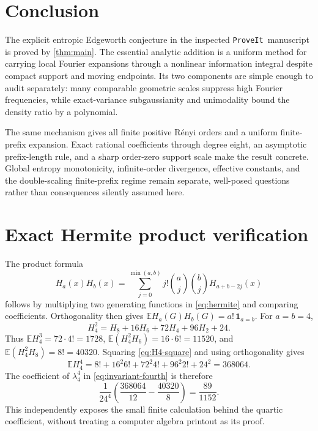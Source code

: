 \documentclass[11pt,a4paper]{article}
\numberwithin{equation}{section}
\theoremstyle{definition}
\theoremstyle{remark}
\newcommand{\E}{\mathbb E}
\newcommand{\repo}{\texttt{ProveIt}}
\begin{document}
\section{Conclusion}

The explicit entropic Edgeworth conjecture in the inspected \repo\ manuscript
is proved by \cref{thm:main}. The essential analytic addition is a uniform
method for carrying local Fourier expansions through a nonlinear information
integral despite compact support and moving endpoints. Its two components are
simple enough to audit separately: many comparable geometric scales suppress
high Fourier frequencies, while exact-variance subgaussianity and unimodality
bound the density ratio by a polynomial.

The same mechanism gives all finite positive R\'enyi orders and a uniform
finite-prefix expansion. Exact rational coefficients through degree eight,
an asymptotic prefix-length rule, and a sharp order-zero support scale make
the result concrete. Global entropy monotonicity, infinite-order divergence,
effective constants, and the double-scaling finite-prefix regime remain
separate, well-posed questions rather than consequences silently assumed here.

\appendix
\section{Exact Hermite product verification}
\label{app:hermite}

The product formula
\begin{equation}
 H_a(x)H_b(x)=\sum_{j=0}^{\min(a,b)}
  j!\binom aj\binom bj H_{a+b-2j}(x)
 \label{eq:hermite-product}
\end{equation}
follows by multiplying two generating functions in \eqref{eq:hermite} and
comparing coefficients. Orthogonality then gives
$\E H_a(G)H_b(G)=a!\,\mathbf1_{a=b}$.
For $a=b=4$,
\begin{equation}
 H_4^2=H_8+16H_6+72H_4+96H_2+24.
 \label{eq:H4-square}
\end{equation}
Thus $\E H_4^3=72\cdot4!=1728$,
$\E(H_4^2H_6)=16\cdot6!=11520$, and
$\E(H_4^2H_8)=8!=40320$. Squaring \eqref{eq:H4-square} and using
orthogonality gives
\[
 \E H_4^4=8!+16^2 6!+72^2 4!+96^2 2!+24^2=368064.
\]
The coefficient of $\lambda_4^4$ in \eqref{eq:invariant-fourth} is therefore
\[
 \frac1{24^4}\left(\frac{368064}{12}-\frac{40320}{8}\right)
 =\frac{89}{1152}.
\]
This independently exposes the small finite calculation behind the quartic
coefficient, without treating a computer algebra printout as its proof.
\end{document}
